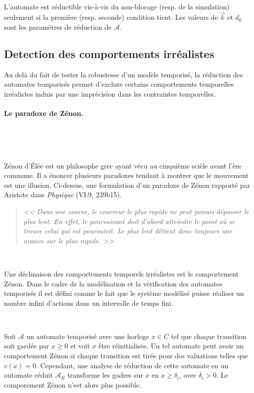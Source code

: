 \documentclass{article}
\begin{document}
      ~
      
      L'automate est réductible vis-à-vis du non-blocage (resp. de la
      simulation) seulement si la première (resp. seconde) condition tient. Les
      valeurs de $\vec{k}$ et $d_0$ sont les paramètres de réduction de
      $\mathcal{A}$.

    \subsection{Detection des comportements irréalistes}

      Au delà du fait de tester la robustesse d'un modèle temporisé, la
      réduction des automates temporisés permet d'exclure certains comportements
      temporelles irréalistes induis par une imprécision dans les contraintes
      temporelles.
    
      \paragraph{Le paradoxe de Zénon.} ~

        ~

        Zénon d'Élée est un philosophe grec ayant vécu au cinquième scièle avant
        l'ère commune. Il a énoncer plusieurs paradoxes tendant à montrer que le
        mouvement est une illusion. Ci-dessus, une formulation d'un paradoxe de
        Zénon rapporté par Aristote dans {\it Physique} (VI:9, 239b15).
      
        \begin{quote} \em
          << Dans une course, le courreur le plus rapide ne peut jamais dépasser
          le plus lent. En effet, le poursuivant doit d'abord atteindre le point
          où se trouve celui qui est poursuivit. Le plus lent détient donc
          toujours une avance sur le plus rapide. >>
        \end{quote}

        ~

        Une déclinaison des comportements temporels irréalistes est le
        comportement Zénon. Dans le cadre de la modélisation et la vérification
        des automates temporisés il est défini comme le fait que le système
        modélisé puisse réaliser un nombre infini d'actions dans un intervalle
        de temps fini.
    
        ~

        Soit $\mathcal{A}$ un automate temporisé avec une horloge $x \in C$ tel
        que chaque transition soit gardée par $x \ge 0$ et voit $x$ être
        réinitialisée. Un tel automate peut avoir un comportement Zénon si
        chaque transition est tirée pour des valuations telles que $v(x) =
        0$. Cependant, une analyse de réduction de cette automate en un automate
        réduit $\mathcal{A}_R$ transforme les gadres sur $x$ en $x \ge
        \delta_i$, avec $\delta_i > 0$. Le comporement Zénon n'est alors plus
        possible.
        
\end{document}
